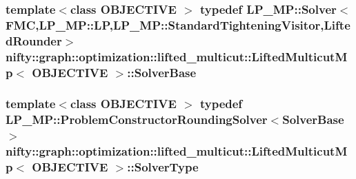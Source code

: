\subsubsection[{Solver\+Base}]{\setlength{\rightskip}{0pt plus 5cm}template$<$class O\+B\+J\+E\+C\+T\+I\+V\+E $>$ typedef L\+P\+\_\+\+M\+P\+::\+Solver$<${\bf F\+M\+C},L\+P\+\_\+\+M\+P\+::\+L\+P,L\+P\+\_\+\+M\+P\+::\+Standard\+Tightening\+Visitor,{\bf Lifted\+Rounder}$>$ {\bf nifty\+::graph\+::optimization\+::lifted\+\_\+multicut\+::\+Lifted\+Multicut\+Mp}$<$ O\+B\+J\+E\+C\+T\+I\+V\+E $>$\+::{\bf Solver\+Base}}\label{classnifty_1_1graph_1_1optimization_1_1lifted__multicut_1_1LiftedMulticutMp_acf2283e9b202825cdc4b0732d88fe639}
\hypertarget{classnifty_1_1graph_1_1optimization_1_1lifted__multicut_1_1LiftedMulticutMp_a687e7439ccc74f27d0b9e975ba874666}{}
\subsubsection[{Solver\+Type}]{\setlength{\rightskip}{0pt plus 5cm}template$<$class O\+B\+J\+E\+C\+T\+I\+V\+E $>$ typedef L\+P\+\_\+\+M\+P\+::\+Problem\+Constructor\+Rounding\+Solver$<${\bf Solver\+Base}$>$ {\bf nifty\+::graph\+::optimization\+::lifted\+\_\+multicut\+::\+Lifted\+Multicut\+Mp}$<$ O\+B\+J\+E\+C\+T\+I\+V\+E $>$\+::{\bf Solver\+Type}}\label{classnifty_1_1graph_1_1optimization_1_1lifted__multicut_1_1LiftedMulticutMp_a687e7439ccc74f27d0b9e975ba874666}
\hypertarget{classnifty_1_1graph_1_1optimization_1_1lifted__multicut_1_1LiftedMulticutMp_af0ec21b5408072a6fee250667b28e7a8}{}
